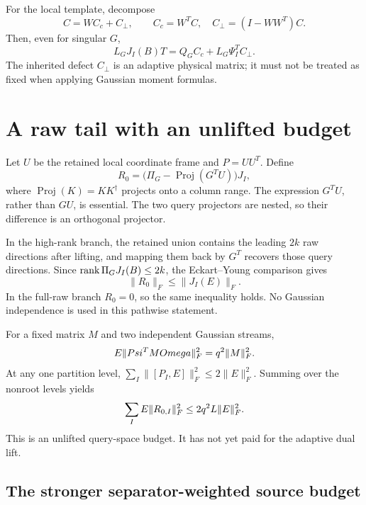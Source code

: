 \documentclass[11pt,oneside,openany,a4paper]{report}
\numberwithin{equation}{chapter}
\theoremstyle{definition}
\theoremstyle{remark}
\begin{document}
For the local template, decompose
\[
 C=WC_c+C_\perp,\qquad C_c=W^TC,
 \quad C_\perp=(I-WW^T)C.
\]
Then, even for singular $G$,
\begin{equation}
 L_GJ_I(B)T=Q_GC_c+L_G\Psi_I^TC_\perp.
 \label{eq:route-separated-signal}
\end{equation}
The inherited defect $C_\perp$ is an adaptive physical matrix; it must
not be treated as fixed when applying Gaussian moment formulas.

\section{A raw tail with an unlifted budget}

Let $U$ be the retained local coordinate frame and $P=UU^T$.  Define
\begin{equation}
 R_0=\bigl(\Pi_G-\operatorname{Proj}(G^TU)\bigr)J_I,
 \label{eq:route-raw-tail}
\end{equation}
where $\operatorname{Proj}(K)=KK^\dagger$ projects onto a column range.
The expression $G^TU$, rather than $GU$, is essential.  The two query
projectors are nested, so their difference is an orthogonal projector.

In the high-rank branch, the retained union contains the leading $2k$
raw directions after lifting, and mapping them back by $G^T$ recovers
those query directions.  Since $\operatorname{rank}\Pi_GJ_I(B)\leq2k$, the
Eckart--Young comparison gives
\begin{equation}
 \lVert R_0\rVert_F\leq\lVert J_I(E)\rVert_F.
 \label{eq:route-unweighted-tail}
\end{equation}
In the full-raw branch $R_0=0$, so the same inequality holds.  No
Gaussian independence is used in this pathwise statement.

For a fixed matrix $M$ and two independent Gaussian streams,
\[
 E\lVert Psi^TMOmega\rVert_F^2=q^2\lVert M\rVert_F^2.
\]
At any one partition level,
$\sum_I\lVert[P_I,E]\rVert_F^2\leq2\lVert E\rVert_F^2$.
Summing over the nonroot levels yields
\begin{equation}
 \sum_IE\lVert R_{0,I}\rVert_F^2
 \leq2q^2L\lVert E\rVert_F^2.
 \label{eq:route-unweighted-global}
\end{equation}
This is an unlifted query-space budget.  It has not yet paid for the
adaptive dual lift.

\subsection{The stronger separator-weighted source budget}
\end{document}
